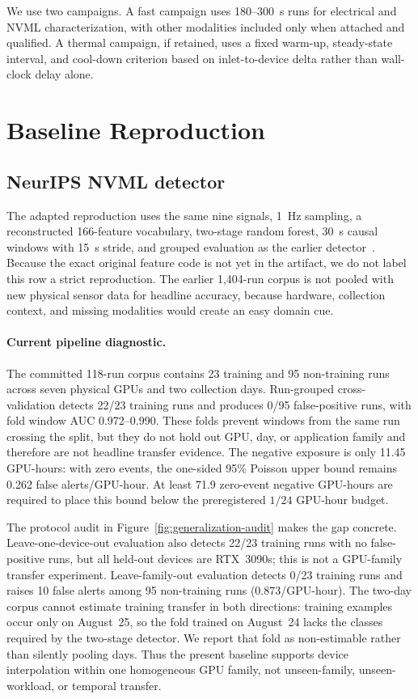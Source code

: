 \documentclass[sigplan,anonymous,review,nonacm]{acmart}
\begin{document}
We use two campaigns. A fast campaign uses 180--300~s runs for electrical and NVML characterization, with other modalities included only when attached and qualified. A thermal campaign, if retained, uses a fixed warm-up, steady-state interval, and cool-down criterion based on inlet-to-device delta rather than wall-clock delay alone.

\section{Baseline Reproduction}

\subsection{NeurIPS NVML detector}

The adapted reproduction uses the same nine signals, 1~Hz sampling, a reconstructed 166-feature vocabulary, two-stage random forest, 30~s causal windows with 15~s stride, and grouped evaluation as the earlier detector~\cite{rahman2026hidden}. Because the exact original feature code is not yet in the artifact, we do not label this row a strict reproduction. The earlier 1,404-run corpus is not pooled with new physical sensor data for headline accuracy, because hardware, collection context, and missing modalities would create an easy domain cue.

\paragraph{Current pipeline diagnostic.}
The committed 118-run corpus contains 23 training and 95 non-training runs across seven physical GPUs and two collection days. Run-grouped cross-validation detects 22/23 training runs and produces 0/95 false-positive runs, with fold window AUC 0.972--0.990. These folds prevent windows from the same run crossing the split, but they do not hold out GPU, day, or application family and therefore are not headline transfer evidence. The negative exposure is only 11.45 GPU-hours: with zero events, the one-sided 95\% Poisson upper bound remains 0.262 false alerts/GPU-hour. At least 71.9 zero-event negative GPU-hours are required to place this bound below the preregistered $1/24$ GPU-hour budget.

The protocol audit in Figure~\ref{fig:generalization-audit} makes the gap concrete. Leave-one-device-out evaluation also detects 22/23 training runs with no false-positive runs, but all held-out devices are RTX~3090s; this is not a GPU-family transfer experiment. Leave-family-out evaluation detects 0/23 training runs and raises 10 false alerts among 95 non-training runs (0.873/GPU-hour). The two-day corpus cannot estimate training transfer in both directions: training examples occur only on August~25, so the fold trained on August~24 lacks the classes required by the two-stage detector. We report that fold as non-estimable rather than silently pooling days. Thus the present baseline supports device interpolation within one homogeneous GPU family, not unseen-family, unseen-workload, or temporal transfer.
\end{document}
